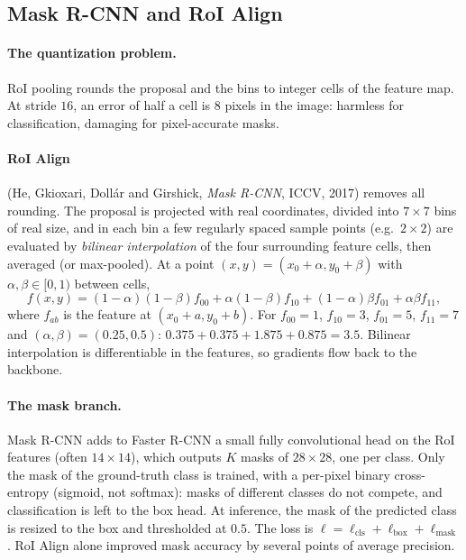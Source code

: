 \begin{notechapter}
\section{Mask R-CNN and RoI Align}\label{detection-segmentation:sec:mask}

\paragraph{The quantization problem.} RoI pooling rounds the proposal and the bins to
integer cells of the feature map. At stride $16$, an error of half a cell is $8$ pixels in the image:
harmless for classification, damaging for pixel-accurate masks.

\paragraph{RoI Align} (He, Gkioxari, Dollár and Girshick, \emph{Mask R-CNN}, ICCV, 2017)
removes all rounding. The proposal is projected with real coordinates, divided into $7\times7$ bins
of real size, and in each bin a few regularly spaced sample points (e.g.\ $2\times2$) are evaluated by
\emph{bilinear interpolation} of the four surrounding feature cells, then averaged (or max-pooled).
At a point $(x,y) = (x_0 + \alpha, y_0 + \beta)$ with $\alpha,\beta\in[0,1)$ between cells,
\[
  f(x,y) = (1 - \alpha)(1 - \beta)f_{00} + \alpha(1 - \beta)f_{10} + (1 - \alpha)\beta f_{01} + \alpha\beta f_{11},
\]
where $f_{ab}$ is the feature at $(x_0 + a, y_0 + b)$. For $f_{00} = 1$, $f_{10} = 3$, $f_{01} = 5$, $f_{11} = 7$ and $(\alpha,\beta) = (0.25, 0.5)$:
$0.375 + 0.375 + 1.875 + 0.875 = 3.5$. Bilinear interpolation is differentiable in the features, so gradients flow
back to the backbone.

\paragraph{The mask branch.} Mask R-CNN adds to Faster R-CNN a small fully convolutional
head on the RoI features (often $14\times14$), which outputs $K$ masks of $28\times28$, one per class. Only the mask of
the ground-truth class is trained, with a per-pixel binary cross-entropy (sigmoid, not
softmax): masks of different classes do not compete, and classification is left to the box
head. At inference, the mask of the predicted class is resized to the box and thresholded at
$0.5$. The loss is $\ell = \ell_{\mathrm{cls}} + \ell_{\mathrm{box}} + \ell_{\mathrm{mask}}$. RoI Align alone improved mask accuracy by several
points of average precision.


\end{notechapter}
